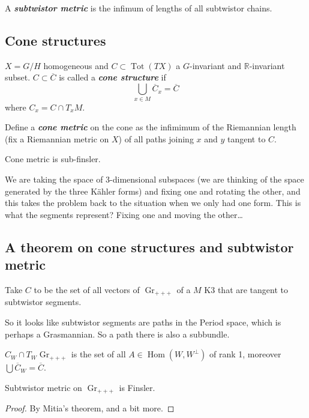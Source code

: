 \begin{defn}\leavevmode
A \textit{\textbf{subtwistor metric}} is the infimum of lengths of all subtwistor chains.
\end{defn}

\subsection{Cone structures}

\begin{defn}\leavevmode
$X=G/H$ homogeneous and $C \subset \operatorname{ Tot}(TX)$ a $G$-invariant and $\mathbb{R}$-invariant subset. $C \subset \overline{C}$ is called a \textit{\textbf{cone structure}} if 
\[\bigcup_{x \in M} \overline{ C}_x=\overline{C}\]
where $C_x = C \cap T_xM$.
\end{defn}

\begin{defn}\leavevmode
Define a \textit{\textbf{cone metric}} on the cone as the infimimum of the Riemannian length (fix a Riemannian metric on $X$) of all paths joining $x$ and $y$ tangent to $C$.
\end{defn}

\begin{thm}[Mitia]\leavevmode
Cone metric is sub-finsler.
\end{thm}

\begin{upshot}\leavevmode
	We are taking the space of 3-dimensional subspaces (we are thinking of the space generated by the three Kähler forms) and fixing one and rotating the other, and this takes the problem back to the situation when we only had one form. This is what the segments represent? Fixing one and moving the other…
\end{upshot}

\subsection{A theorem on cone structures and subtwistor metric}

Take $C$ to be the set of all vectors of $\operatorname{Gr}_{+ + +}$ of a $M$ K3 that are tangent to subtwistor segments.

\begin{remark}[dani]\leavevmode
	So it looks like subtwistor segments are paths in the Period space, which is perhaps a Grasmannian. So a path there is also a subbundle.
\end{remark}

\begin{claim}\leavevmode
	$C_W \cap T_W \operatorname{Gr}_{+ + +}$ is the set of all $A \in \operatorname{Hom}(W,W^\perp)$ of rank 1, moreover $\bigcup \overline{C}_W=\overline{C} $.
\end{claim}

\begin{coro}\leavevmode
	Subtwistor metric on $\operatorname{Gr}_{++ +}$ is Finsler.
\end{coro}

\begin{proof}\leavevmode
By Mitia's theorem, and a bit more.
\end{proof}


